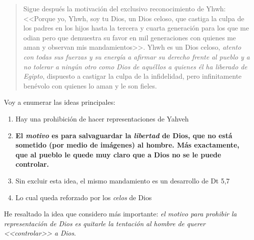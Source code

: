 \documentclass{article}
\begin{document}
\begin{quote}
Sigue después la motivación del exclusivo reconocimiento de Yhwh: <<Porque yo, Yhwh, soy tu Dios, un Dios celoso, que castiga la culpa de los padres en los hijos hasta la tercera y cuarta generación para los que me odian pero que demuestra su favor en mil generaciones con quienes me aman y observan mis mandamientos>>. Yhwh es un Dios celoso, \emph{atento con todas sus fuerzas y su energía a afirmar su derecho frente al pueblo y a no tolerar a ningún otro como Dios de aquéllos a quienes él ha liberado de Egipto}, dispuesto a castigar la culpa de la infidelidad, pero infinitamente benévolo con quienes lo aman y le son fieles.
\end{quote}

\noindent
Voy a enumerar las ideas principales:

\begin{enumerate}
\item Hay una prohibici\'on de hacer representaciones de Yahveh
\item \textbf{El \emph{motivo} es para salvaguardar la \emph{libertad} de Dios, que no est\'a sometido (por medio de im\'agenes) al hombre. M\'as exactamente, que al pueblo le quede muy claro que a Dios no se le puede controlar.}
\item Sin excluir esta idea, el mismo mandamiento es un desarrollo de Dt 5,7
\item Lo cual queda reforzado por los \emph{celos} de Dios
\end{enumerate}

\noindent
He resaltado la idea que considero m\'as importante: \emph{el motivo para prohibir la representaci\'on de Dios es quitarle la tentaci\'on al hombre de querer <<controlar>> a Dios}.


\end{document}
